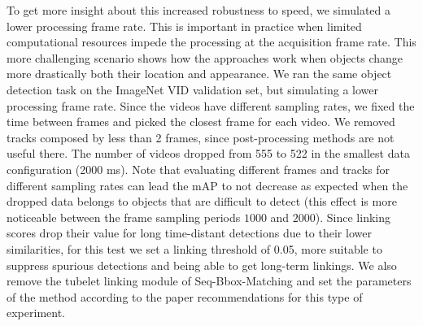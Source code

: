 \documentclass[letterpaper, 10 pt, conference]{ieeeconf}
\begin{document}
To get more insight about this increased robustness to speed, we simulated a lower processing frame rate. This is 
important in practice when limited computational resources impede the processing at the acquisition frame rate. 
This more challenging scenario 
shows how the approaches work when objects change more drastically both their location and appearance. 
We ran the same object detection task on the ImageNet VID validation set, but simulating a lower processing frame rate. Since the videos have different sampling rates, we fixed the time between frames and picked the closest frame for each video.  
We removed tracks composed by less than 2 frames, since post-processing methods are not useful there. The number of videos dropped from 555 to 522 in the smallest data configuration (2000 ms). 
Note that evaluating different frames and tracks for different sampling rates can lead the mAP to not decrease as expected when the dropped data belongs to objects that are difficult to detect (this effect is more noticeable between the frame sampling periods $1000$ and $2000$).
Since linking scores drop their value for long time-distant detections due to their lower similarities, for this test we set a linking threshold of 0.05,
more suitable to suppress spurious detections and being able to get long-term linkings. We also remove the tubelet linking module of Seq-Bbox-Matching and set the parameters of the method according to the paper recommendations for this type of experiment.
\end{document}
